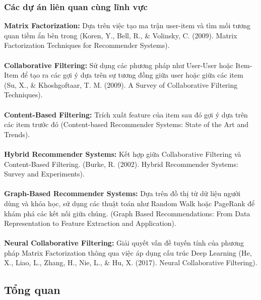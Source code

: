 \subsubsection{Các dự án liên quan cùng lĩnh vực}
\textbf{Matrix Factorization:} Dựa trên việc tạo ma trận user-item và tìm mối tương quan tiềm ẩn bên trong (Koren, Y., Bell, R., \& Volinsky, C. (2009). Matrix Factorization Techniques for Recommender Systems).\\
\\
\textbf{Collaborative Filtering:}  Sử dụng các phương pháp như User-User hoặc Item-Item để tạo ra các gợi ý dựa trên sự tương đồng giữa user hoặc giữa các item (Su, X., \& Khoshgoftaar, T. M. (2009). A Survey of Collaborative Filtering Techniques).\\
\\
\textbf{Content-Based Filtering:} Trích xuất feature của item sau đó gợi ý dựa trên các item trước đó (Content-based Recommender Systems: State of the Art and Trends).\\
\\
\textbf{Hybrid Recommender Systems:} Kết hợp giữa Collaborative Filtering và Content-Based Filtering. (Burke, R. (2002). Hybrid Recommender Systems: Survey and Experiments).\\
\\
\textbf{Graph-Based Recommender Systems:} Dựa trên đồ thị từ dữ liệu người dùng và khóa học, sử dụng các thuật toán như Random Walk hoặc PageRank để khám phá các kết nối giữa chúng. (Graph Based Recommendations: From Data Representation to Feature Extraction and Application).\\
\\
\textbf{Neural Collaborative Filtering:} Giải quyết vấn đề tuyến tính của phương pháp Matrix Factorization thông qua việc áp dụng cấu trúc Deep Learning (He, X., Liao, L., Zhang, H., Nie, L., \& Hu, X. (2017). Neural Collaborative Filtering).
\subsection{Tổng quan}
